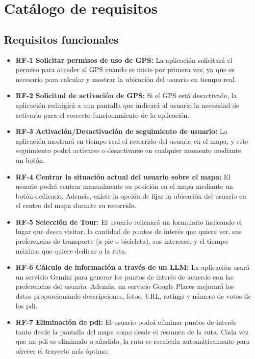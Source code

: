 \section{Catálogo de requisitos}
\subsection{Requisitos funcionales}
\begin{itemize}
	\item \textbf{RF-1 Solicitar permisos de uso de GPS:} La aplicación solicitará el permiso para acceder al GPS cuando se inicie por primera vez, ya que es necesario para calcular y mostrar la ubicación del usuario en tiempo real.
	
	\item \textbf{RF-2 Solicitud de activación de GPS:} Si el GPS está desactivado, la aplicación redirigirá a una pantalla que indicará al usuario la necesidad de activarlo para el correcto funcionamiento de la aplicación.
	
	\item \textbf{RF-3 Activación/Desactivación de seguimiento de usuario:} La aplicación mostrará en tiempo real el recorrido del usuario en el mapa, y este seguimiento podrá activarse o desactivarse en cualquier momento mediante un botón.
	
	\item \textbf{RF-4 Centrar la situación actual del usuario sobre el mapa:} El usuario podrá centrar manualmente su posición en el mapa mediante un botón dedicado. Además, existe la opción de fijar la ubicación del usuario en el centro del mapa durante su recorrido.
	
	\item \textbf{RF-5 Selección de Tour:} El usuario rellenará un formulario indicando el lugar que desea visitar, la cantidad de puntos de interés que quiere ver, sus preferencias de transporte (a pie o bicicleta), sus intereses, y el tiempo máximo que quiere dedicar a la ruta.
	
	\item \textbf{RF-6 Cálculo de información a través de un LLM:} La aplicación usará un servicio Gemini para generar los puntos de interés de acuerdo con las preferencias del usuario. Además, un servicio Google Places mejorará los datos proporcionando descripciones, fotos, URL, ratings y número de votos de los \acrshort{pdi}.
	
	\item \textbf{RF-7 Eliminación de \acrshort{pdi}:} El usuario podrá eliminar puntos de interés tanto desde la pantalla del mapa como desde el resumen de la ruta. Cada vez que un \acrshort{pdi} es eliminado o añadido, la ruta se recalcula automáticamente para ofrecer el trayecto más óptimo.
	

\end{itemize}
